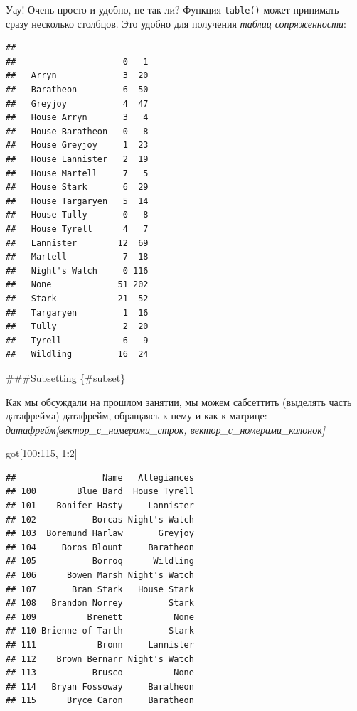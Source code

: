 \documentclass[]{book}
\newenvironment{Shaded}{\begin{snugshade}}{\end{snugshade}}
\newcommand{\DecValTok}[1]{\textcolor[rgb]{0.00,0.00,0.81}{#1}}
\newcommand{\KeywordTok}[1]{\textcolor[rgb]{0.13,0.29,0.53}{\textbf{#1}}}
\newcommand{\NormalTok}[1]{#1}
\newcommand{\OperatorTok}[1]{\textcolor[rgb]{0.81,0.36,0.00}{\textbf{#1}}}
\begin{document}
Уау! Очень просто и удобно, не так ли? Функция \texttt{table()} может принимать сразу несколько столбцов. Это удобно для получения \emph{таблиц сопряженности}:

\begin{Shaded}
\end{Shaded}

\begin{verbatim}
##                  
##                     0   1
##   Arryn             3  20
##   Baratheon         6  50
##   Greyjoy           4  47
##   House Arryn       3   4
##   House Baratheon   0   8
##   House Greyjoy     1  23
##   House Lannister   2  19
##   House Martell     7   5
##   House Stark       6  29
##   House Targaryen   5  14
##   House Tully       0   8
##   House Tyrell      4   7
##   Lannister        12  69
##   Martell           7  18
##   Night's Watch     0 116
##   None             51 202
##   Stark            21  52
##   Targaryen         1  16
##   Tully             2  20
##   Tyrell            6   9
##   Wildling         16  24
\end{verbatim}

\#\#\#Subsetting \{\#subset\}

Как мы обсуждали на прошлом занятии, мы можем сабсеттить (выделять часть датафрейма) датафрейм, обращаясь к нему и как к матрице: \emph{датафрейм{[}вектор\_с\_номерами\_строк, вектор\_с\_номерами\_колонок{]}}

\begin{Shaded}
\begin{Highlighting}[]
\NormalTok{got[}\DecValTok{100}\OperatorTok{:}\DecValTok{115}\NormalTok{, }\DecValTok{1}\OperatorTok{:}\DecValTok{2}\NormalTok{]}
\end{Highlighting}
\end{Shaded}

\begin{verbatim}
##                 Name   Allegiances
## 100        Blue Bard  House Tyrell
## 101    Bonifer Hasty     Lannister
## 102           Borcas Night's Watch
## 103  Boremund Harlaw       Greyjoy
## 104     Boros Blount     Baratheon
## 105           Borroq      Wildling
## 106      Bowen Marsh Night's Watch
## 107       Bran Stark   House Stark
## 108   Brandon Norrey         Stark
## 109          Brenett          None
## 110 Brienne of Tarth         Stark
## 111            Bronn     Lannister
## 112    Brown Bernarr Night's Watch
## 113           Brusco          None
## 114   Bryan Fossoway     Baratheon
## 115      Bryce Caron     Baratheon
\end{verbatim}
\end{document}
